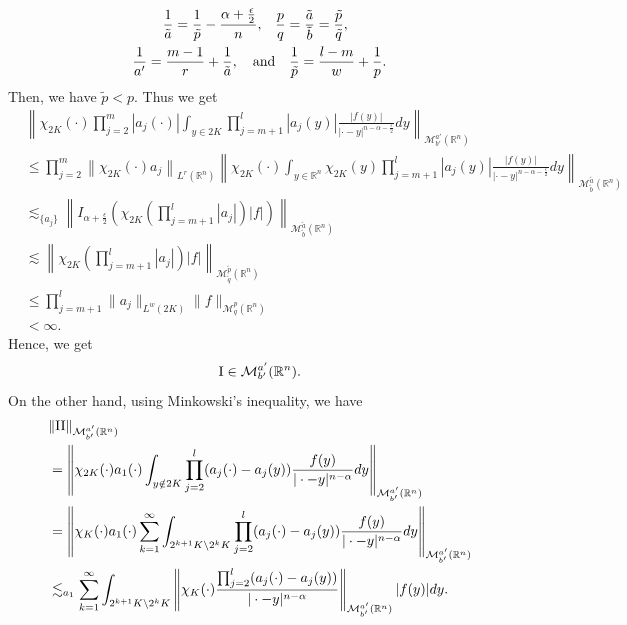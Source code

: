 \documentclass[11pt,a4]{article}
\numberwithin{equation}{section}
\theoremstyle{definition}
\theoremstyle{remark}
\begin{document}
\begin{align*}
	\frac{1}{\tilde{a}}=\frac{1}{\tilde{p}}-\frac{\alpha+\frac{\epsilon}{2}}{n}, \quad& \frac{p}{q}=\frac{\tilde{a}}{\tilde{b}}=\frac{\tilde{p}}{\tilde{q}}, \\ 
	\frac{1}{a'}=\frac{m-1}{r}+\frac{1}{\tilde{a}}, \quad {\rm and}& \quad \frac{1}{\tilde{p}}=\frac{l-m}{w}+\frac{1}{p}.
\end{align*}
Then, we have $\tilde{p} < p$. Thus we get
\begin{align*}
    	&\left\| \chi_{2K}(\cdot) \prod_{j=2}^m|a_j(\cdot)| \int_{y \in 2K} \prod_{j=m+1}^l|a_j(y)|\frac{|f(y)|}{|\cdot-y|^{n-\alpha-\frac{\epsilon}{2}}}dy\right\|_{{\mathcal M}^{a'}_{b'}({\mathbb R}^n)}\\
	&\le \prod_{j=2}^{m} \left\| \chi_{2K}(\cdot) a_j\right\|_{L^r({\mathbb R}^n)} \left\| \chi_{2K}(\cdot) \int_{y \in {\mathbb R}^n} \chi_{2K}(y) \prod_{j=m+1}^l |a_j(y)|\frac{|f(y)|}{|\cdot-y|^{n-\alpha-\frac{\epsilon}{2}}}dy\right\|_{{\mathcal M}^{\tilde{a}}_{\tilde{b}}({\mathbb R}^n)}\\
	&\lesssim_{\{a_j\}} \left\| I_{\alpha+\frac{\epsilon}{2}}\left(\chi_{2K}(\prod_{j=m+1}^{l}|a_j|)|f|\right) \right\|_{{\mathcal M}^{\tilde{a}}_{\tilde{b}}({\mathbb R}^n)}\\
	&\lesssim \left\| \chi_{2K}\left(\prod_{j=m+1}^{l}|a_j|\right)|f| \right\|_{{\mathcal M}^{\tilde{p}}_{\tilde{q}}({\mathbb R}^n)}\\
	&\le \prod_{j=m+1}^{l} \|a_j\|_{L^w(2K)} \|f\|_{{\mathcal M}^{p}_{q}({\mathbb R}^n)}\\
	&< \infty.
\end{align*}
Hence, we get
\[
	{\rm I} \in {\mathcal M}^{a'}_{b'}({\mathbb R}^n).
\]
On the other hand, using Minkowski's inequality, we have
\begin{align*}
	&\|{\rm II}\|_{{\mathcal M}^{a'}_{b'}({\mathbb R}^n)}\\
	&=\left\| \chi_{2K}(\cdot) a_1(\cdot) \int_{y \notin 2K} \prod_{j=2}^{l}(a_j(\cdot)-a_j(y)) \frac{f(y)}{|\cdot - y|^{n-\alpha}}dy \right\|_{{\mathcal M}^{a'}_{b'}({\mathbb R}^n)}\\
	&=\left\| \chi_K(\cdot)a_1(\cdot) \sum_{k=1}^{\infty}  \int_{2^{k+1}K \backslash 2^kK} \prod_{j=2}^{l}(a_j(\cdot)-a_j(y)) \frac{f(y)}{|\cdot - y|^{n-\alpha}}dy \right\|_{{\mathcal M}^{a'}_{b'}({\mathbb R}^n)}\\
	&\lesssim_{a_1} \sum_{k=1}^{\infty} \int_{2^{k+1}K \backslash 2^kK} \left\| \chi_K(\cdot) \frac{ \prod_{j=2}^{l}(a_j(\cdot)-a_j(y))}{|\cdot - y|^{n-\alpha}}\right\|_{{\mathcal M}^{a'}_{b'}({\mathbb R}^n)} |f(y)|dy.
\end{align*}
\end{document}
